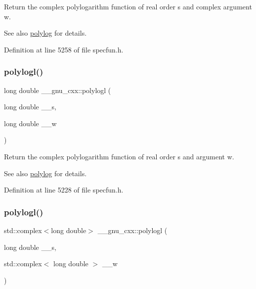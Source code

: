 Return the complex polylogarithm function of real order {\ttfamily s} and complex argument {\ttfamily w}.

\begin{DoxySeeAlso}{See also}
\hyperlink{group__mathsf__gnu_gabcc5480ad739561c2debd6a8a352084f}{polylog} for details. 
\end{DoxySeeAlso}


Definition at line 5258 of file specfun.\+h.

\mbox{\label{group__mathsf__gnu_ga3aa007b4b4e345c30be015ab145d5598}} 
\subsubsection{\texorpdfstring{polylogl()}{polylogl()}\hspace{0.1cm}{\footnotesize\ttfamily [1/2]}}
{\footnotesize\ttfamily long double \+\_\+\+\_\+gnu\+\_\+cxx\+::polylogl (\begin{DoxyParamCaption}\item[{long double}]{\+\_\+\+\_\+s,  }\item[{long double}]{\+\_\+\+\_\+w }\end{DoxyParamCaption})\hspace{0.3cm}{\ttfamily [inline]}}

Return the complex polylogarithm function of real order {\ttfamily s} and argument {\ttfamily w}.

\begin{DoxySeeAlso}{See also}
\hyperlink{group__mathsf__gnu_gabcc5480ad739561c2debd6a8a352084f}{polylog} for details. 
\end{DoxySeeAlso}


Definition at line 5228 of file specfun.\+h.

\mbox{\label{group__mathsf__gnu_ga9eb79e506eda210610bc59c1912b4d0f}} 
\subsubsection{\texorpdfstring{polylogl()}{polylogl()}\hspace{0.1cm}{\footnotesize\ttfamily [2/2]}}
{\footnotesize\ttfamily std\+::complex$<$long double$>$ \+\_\+\+\_\+gnu\+\_\+cxx\+::polylogl (\begin{DoxyParamCaption}\item[{long double}]{\+\_\+\+\_\+s,  }\item[{std\+::complex$<$ long double $>$}]{\+\_\+\+\_\+w }\end{DoxyParamCaption})\hspace{0.3cm}{\ttfamily [inline]}}

